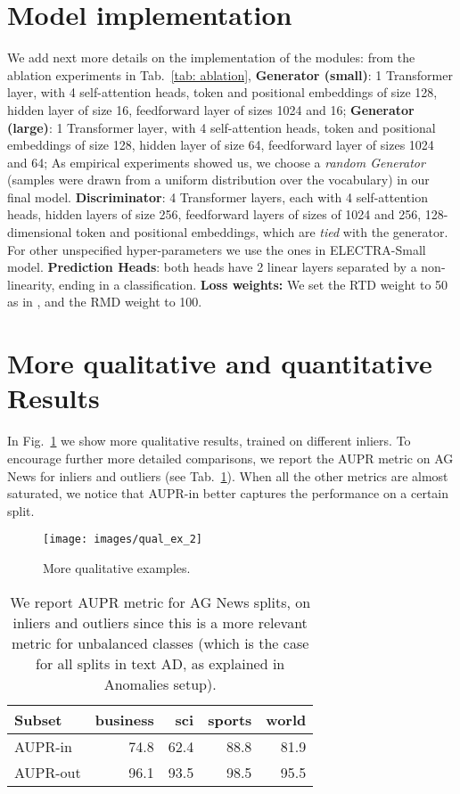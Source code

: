 \documentclass[11pt]{article}
\begin{document}
\section{Model implementation}
\label{apx:model_implementation_details}
We add next more details on the implementation of the modules: from the ablation experiments in Tab.~\ref{tab: ablation}, \textbf{Generator (small)}: 1 Transformer layer, with 4 self-attention heads, token and positional embeddings of size 128, hidden layer of size 16, feedforward layer of sizes 1024 and 16; \textbf{Generator (large)}: 1 Transformer layer, with 4 self-attention heads, token and positional embeddings of size 128, hidden layer of size 64, feedforward layer of sizes 1024 and 64;
As empirical experiments showed us, we choose a \emph{random Generator} (samples were drawn from a uniform distribution over the vocabulary) in our final model.
\textbf{Discriminator}: 4 Transformer layers, each with 4 self-attention heads, hidden layers of size 256, feedforward layers of sizes of 1024 and 256, 128-dimensional token and positional embeddings, which are \emph{tied} with the generator. For other unspecified hyper-parameters we use the ones in ELECTRA-Small model.
\textbf{Prediction Heads}: both heads have 2 linear layers separated by a non-linearity, ending in a classification. \textbf{Loss weights:} We set the RTD  weight to 50 as in \cite{Clark2020}, and the RMD  weight to 100.


\section{More qualitative and quantitative Results}
\label{apx:prauc_experiments}
In Fig.~\ref{fig: qual_ex_2} we show more qualitative results, trained on different inliers. To encourage further more detailed comparisons, we report the AUPR metric on AG News for inliers and outliers (see Tab.~\ref{tab:prauc_experiments}). When all the other metrics are almost saturated, we notice that AUPR-in better captures the performance on a certain split.


\begin{figure}[t]
\centering
\texttt{[image: images/qual\_ex\_2]} 
\caption{More qualitative examples.}
\label{fig: qual_ex_2}
\end{figure}


\begin{table}[t]
\centering
\begin{tabular}{l  r r r r}
\toprule
\multicolumn{1}{p{1cm}}{Subset} & business & sci & sports & world\\
\midrule
AUPR-in  & 74.8 & 62.4 & 88.8 & 81.9 \\
AUPR-out & 96.1 & 93.5 & 98.5 & 95.5 \\

\bottomrule
\end{tabular}
\caption{We report AUPR metric for AG News splits, on inliers and outliers since this is a more relevant metric for unbalanced classes (which is the case for all splits in text AD, as explained in Anomalies setup).}
\label{tab:prauc_experiments}
\end{table}
\end{document}
